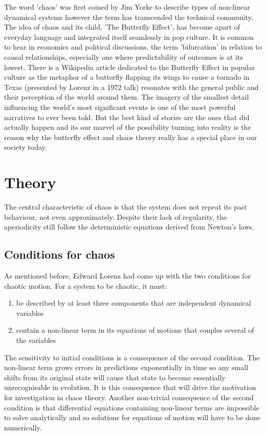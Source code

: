 \documentclass[aps,prl,reprint,10pt,amsmath,amssymb,superscriptaddress,a4paper]{revtex4-2}
\begin{document}
The word 'chaos' was first coined by Jim Yorke to describe types of non-linear dynamical systems however the term has transcended the technical 
community. The idea of chaos and its child, 'The Butterfly Effect', has become apart of everyday language and integrated itself seamlessly in pop 
culture. It is common to hear in economics and political discussions, the term 'bifurcation' in relation to causal relationships, especially one 
where predictability of outcomes is at its lowest. There is a Wikipedia article dedicated to the Butterfly Effect in popular culture as the metaphor 
of a butterfly flapping its wings to cause a tornado in Texas (presented by Lorenz in a 1972 talk) resonates with the general public and their 
perception of the world around them. The imagery of the smallest detail influencing the world's most significant events is one of the most powerful 
narratives to ever been told. But the best kind of stories are the ones that did actually happen and its our marvel of the possibility turning 
into reality is the reason why the butterfly effect and chaos theory really has a special place in our society today.

\section{Theory}

The central characteristic of chaos is that the system does not repeat its past behaviour, not even approximately. Despite their lack of regularity, 
the aperiodicity still follow the deterministic equations derived from Newton's laws.

\subsection{Conditions for chaos}

As mentioned before, Edward Lorenz had come up with the two conditions for chaotic motion. For a system to be chaotic, it must:

\begin{enumerate}
    \item be described by at least three components that are independent dynamical variables
    \item contain a non-linear term in its equations of motions that couples several of the variables
\end{enumerate}

The sensitivity to initial conditions is a consequence of the second condition. The non-linear term grows errors in predictions exponentially in time so 
any small shifts from its original state will cause that state to become essentially unrecognisable in evolution. It is this consequence that will drive 
the motivation for investigation in chaos theory. Another non-trivial consequence of the second condition is that differential equations containing non-linear 
terms are impossible to solve analytically and so solutions for equations of motion will have to be done numerically.
\end{document}

